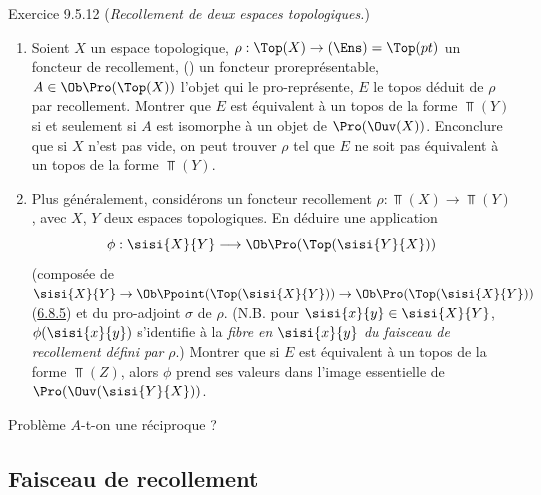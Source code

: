 \documentclass[10pt]{../fichiers-configuration-latex/smfart}
\begin{document}
\begin{enonce*}[remark]{Exercice 9.5.12}
(\emph{Recollement de deux espaces topologiques.})
\begin{enumerate}
\renewcommand{\theenumi}{\alph{enumi}}
\renewcommand{\labelenumi}{\theenumi)}
\item Soient $X$ un espace topologique, $\rho:\Top(X)\rightarrow
(\Ens)=\Top(pt)$ un foncteur de recollement, \ie () un
foncteur proreprésentable, $A\in \Ob \Pro(\Top(X))$ l'objet qui le
pro-représente, $E$ le topos déduit de $\rho$ par recollement.
Montrer que $E$ est équivalent à un topos de la forme $\Top(Y)$ si
et seulement si $A$ est isomorphe à un objet de $\Pro(\Ouv(X))$.
En\pageoriginale conclure que si $X$ n'est pas vide, on peut trouver
$\rho$ tel que $E$ ne soit pas équivalent à un topos de la forme
$\Top(Y)$.

\item Plus généralement, considérons un foncteur recollement
$\rho:\Top(X)\rightarrow \Top(Y)$, avec $X$, $Y$ deux espaces
topologiques. En déduire une application
$$
\phi:\sisi{X}{Y}\longrightarrow \Ob \Pro(\Top(\sisi{Y}{X}))
$$
(composée de $\sisi{X}{Y}\rightarrow
\Ob \Ppoint(\Top(\sisi{X}{Y}))\rightarrow
\Ob\Pro(\Top(\sisi{X}{Y}))$ (\hyperref[IV.subsubsec6.8.5]{6.8.5}) et du pro-adjoint
$\sigma$ de $\rho$. (N.B. pour $\sisi{x}{y}\in \sisi{X}{Y}$,
$\phi(\sisi{x}{y})$ s'identifie à la
\emph{fibre en $\sisi{x}{y}$ du faisceau de recollement} 
\emph{défini par} $\rho$.) Montrer que si $E$ est équivalent à un
topos de la forme $\Top(Z)$, alors $\phi$ prend ses valeurs dans
l'image essentielle de $\Pro(\Ouv(\sisi{Y}{X}))$.
\end{enumerate}
\end{enonce*}

\begin{enonce*}[remark]{Problème}
$A$-t-on une réciproque ?
\end{enonce*}

\subsection{Faisceau de recollement}
\end{document}
